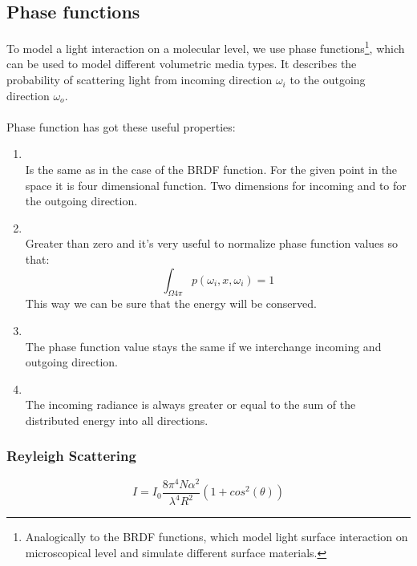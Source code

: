 \subsection{Phase functions}
To model a light interaction on a molecular level, we use phase functions\footnote{Analogically to the BRDF functions, which model light surface interaction on microscopical level and simulate different surface materials.}, which can be used to model different volumetric media types. It describes the probability of scattering light from incoming direction $\omega_{i}$ to the outgoing direction $\omega_{o}$.
\\
\\
Phase function has got these useful properties:
 \begin{enumerate}
\item {}\\
Is the same as in the case of the BRDF function. For the given point in the space it is four dimensional function. Two dimensions for incoming and to for the outgoing direction.
\item {}\\
Greater than zero and it's very useful to normalize phase function values so that:
\begin{equation}
\int_{\Omega\text{4}\pi}p(\omega_{i},x,\omega_{i})=1
\end{equation}
This way we can be sure that the energy will be conserved.
\item {}\\
The phase function value stays the same if we interchange incoming and outgoing direction.
\item {}\\
The incoming radiance is always greater or equal to the sum of the distributed energy into all directions.
\end{enumerate}

\subsubsection{Reyleigh Scattering}
\begin{equation}
I=I_0\frac{8\pi^{4}N\alpha^{2}}{\lambda ^{4}R^{2}}(1+cos^{2}(\theta))
\end{equation}







